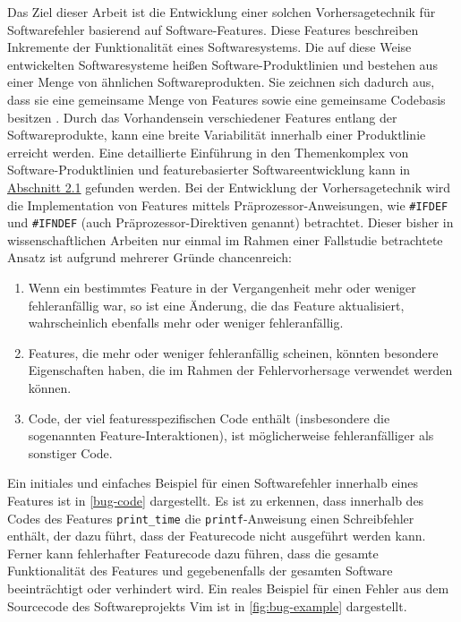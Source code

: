 Das Ziel dieser Arbeit ist die Entwicklung einer solchen Vorhersagetechnik für Softwarefehler basierend auf Software-Features. Diese Features beschreiben Inkremente der Funktionalität eines Softwaresystems. Die auf diese Weise entwickelten Softwaresysteme heißen Software-Produktlinien und bestehen aus einer Menge von ähnlichen Softwareprodukten. Sie zeichnen sich dadurch aus, dass sie eine gemeinsame Menge von Features sowie eine gemeinsame Codebasis besitzen \cite{Thuem2014}. Durch das Vorhandensein verschiedener Features entlang der Softwareprodukte, kann eine breite Variabilität innerhalb einer Produktlinie erreicht werden. Eine detaillierte Einführung in den Themenkomplex von Software-Produktlinien und featurebasierter Softwareentwicklung kann in \hyperref[feat-develop]{Abschnitt 2.1} gefunden werden. Bei der Entwicklung der Vorhersagetechnik wird die Implementation von Features mittels Präprozessor-Anweisungen, wie \texttt{\#IFDEF} und \texttt{\#IFNDEF} (auch Präprozessor-Direktiven genannt) betrachtet. Dieser bisher in wissenschaftlichen Arbeiten nur einmal im Rahmen einer Fallstudie betrachtete Ansatz \cite{Queiroz2016} ist aufgrund mehrerer Gründe chancenreich:

\begin{enumerate}
\setlength{\itemsep}{-2pt}
\item Wenn ein bestimmtes Feature in der Vergangenheit mehr oder weniger fehleranfällig war, so ist eine Änderung, die das Feature aktualisiert, wahrscheinlich ebenfalls mehr oder weniger fehleranfällig. 
\item Features, die mehr oder weniger fehleranfällig scheinen, könnten besondere Eigenschaften haben, die im Rahmen der Fehlervorhersage verwendet werden können.
\item Code, der viel featuresspezifischen Code enthält (insbesondere die sogenannten Feature-Interaktionen), ist möglicherweise fehleranfälliger als sonstiger Code.
\end{enumerate}

Ein initiales und einfaches Beispiel für einen Softwarefehler innerhalb eines Features ist in \autoref{bug-code} dargestellt. Es ist zu erkennen, dass innerhalb des Codes des Features \texttt{print\_time} die \texttt{printf}-Anweisung einen Schreibfehler enthält, der dazu führt, dass der Featurecode nicht ausgeführt werden kann. Ferner kann fehlerhafter Featurecode dazu führen, dass die gesamte Funktionalität des Features und gegebenenfalls der gesamten Software beeinträchtigt oder verhindert wird. Ein reales Beispiel für einen Fehler aus dem Sourcecode des Softwareprojekts Vim ist in \autoref{fig:bug-example} dargestellt.

